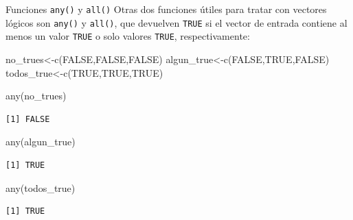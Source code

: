 \documentclass[
  ignorenonframetext,
  aspectratio=169,
  spanish,
]{beamer}
\newenvironment{Shaded}{\begin{snugshade}}{\end{snugshade}}
\newcommand{\ConstantTok}[1]{\textcolor[rgb]{0.56,0.35,0.01}{#1}}
\newcommand{\FunctionTok}[1]{\textcolor[rgb]{0.28,0.35,0.67}{#1}}
\newcommand{\NormalTok}[1]{\textcolor[rgb]{0.00,0.23,0.31}{#1}}
\newcommand{\OtherTok}[1]{\textcolor[rgb]{0.00,0.23,0.31}{#1}}
\begin{document}
\begin{frame}[fragile]{Funciones \texttt{any()} y \texttt{all()}}
\label{funciones-any-y-all}
Otras dos funciones útiles para tratar con vectores lógicos son
\texttt{any()} y \texttt{all()}, que devuelven \texttt{TRUE} si el
vector de entrada contiene al menos un valor \texttt{TRUE} o solo
valores \texttt{TRUE}, respectivamente:

\begin{Shaded}
\begin{Highlighting}[]
\NormalTok{no\_trues}\OtherTok{\textless{}{-}}\FunctionTok{c}\NormalTok{(}\ConstantTok{FALSE}\NormalTok{,}\ConstantTok{FALSE}\NormalTok{,}\ConstantTok{FALSE}\NormalTok{) }
\NormalTok{algun\_true}\OtherTok{\textless{}{-}}\FunctionTok{c}\NormalTok{(}\ConstantTok{FALSE}\NormalTok{,}\ConstantTok{TRUE}\NormalTok{,}\ConstantTok{FALSE}\NormalTok{) }
\NormalTok{todos\_true}\OtherTok{\textless{}{-}}\FunctionTok{c}\NormalTok{(}\ConstantTok{TRUE}\NormalTok{,}\ConstantTok{TRUE}\NormalTok{,}\ConstantTok{TRUE}\NormalTok{)}
\end{Highlighting}
\end{Shaded}

\begin{Shaded}
\begin{Highlighting}[]
\FunctionTok{any}\NormalTok{(no\_trues) }
\end{Highlighting}
\end{Shaded}

\begin{verbatim}
[1] FALSE
\end{verbatim}

\begin{Shaded}
\begin{Highlighting}[]
\FunctionTok{any}\NormalTok{(algun\_true)}
\end{Highlighting}
\end{Shaded}

\begin{verbatim}
[1] TRUE
\end{verbatim}

\begin{Shaded}
\begin{Highlighting}[]
\FunctionTok{any}\NormalTok{(todos\_true) }
\end{Highlighting}
\end{Shaded}

\begin{verbatim}
[1] TRUE
\end{verbatim}
\end{frame}
\end{document}
